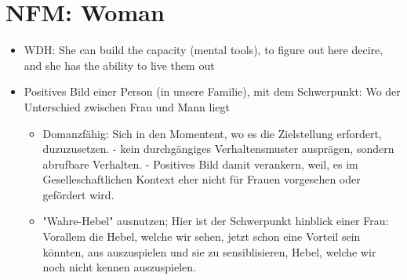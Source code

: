 \section{NFM: Woman}

\begin{itemize}
	\item WDH: She can build the capacity (mental tools), to figure out here decire, and she has the ability to live them out
	\item Positives Bild einer Person (in unsere Familie), mit dem Schwerpunkt: Wo der Unterschied zwischen Frau und Mann liegt
	\begin{itemize}
		\item Domanzfähig: Sich in den Momentent, wo es die Zielstellung erfordert, duzuzusetzen. - kein durchgängiges Verhaltensmuster ausprägen, sondern abrufbare Verhalten. - Positives Bild damit verankern, weil, es im Geselleschaftlichen Kontext eher nicht für Frauen vorgesehen oder gefördert wird.
		\item "Wahre-Hebel" ausnutzen; Hier ist der Schwerpunkt hinblick einer Frau: Vorallem die Hebel, welche wir sehen, jetzt schon eine Vorteil sein könnten, aus auszuspielen und sie zu sensiblisieren, Hebel, welche wir noch nicht kennen auszuspielen.
	\end{itemize}
\end{itemize}


